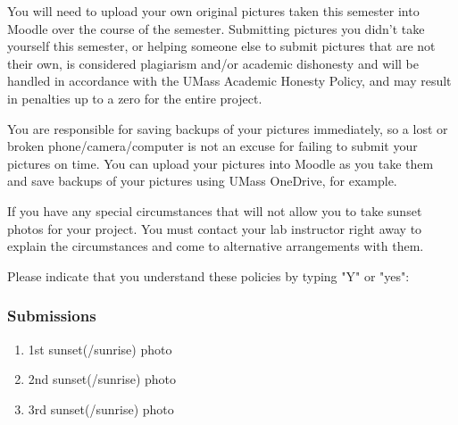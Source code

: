 \documentclass[12pt]{article}
\begin{document}
You will need to upload your own original pictures taken this semester into Moodle over the course of the semester. Submitting pictures you didn't take yourself this semester, or helping someone else to submit pictures that are not their own, is considered plagiarism and/or academic dishonesty and will be handled in accordance with the UMass Academic Honesty Policy, and may result in penalties up to a zero for the entire project.

You are responsible for saving backups of your pictures immediately, so a lost or broken phone/camera/computer is not an excuse for failing to submit your pictures on time. You can upload your pictures into Moodle as you take them and save backups of your pictures using UMass OneDrive, for example.

If you have any special circumstances that will not allow you to take sunset photos for your project. You must contact your lab instructor right away to explain the circumstances and come to alternative arrangements with them.

Please indicate that you understand these policies by typing "Y" or "yes":

\subsubsection{Submissions}
\begin{enumerate}
    \item 1st sunset(/sunrise) photo
    \item 2nd sunset(/sunrise) photo
    \item 3rd sunset(/sunrise) photo
\end{enumerate}
\end{document}
